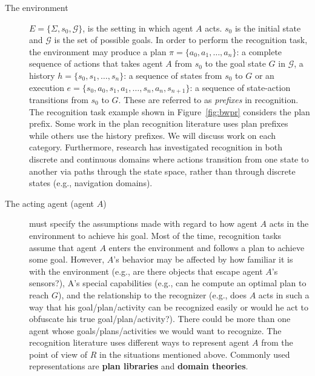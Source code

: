 \begin{description}
\item [The environment] $E = \lbrace \Sigma, s_0, \mathcal{G}\rbrace$, is the setting in which agent $A$ acts. $s_0$ is the initial state and $\mathcal{G}$ is the set of possible goals. 
In order to perform the recognition task, the environment may produce a plan $\pi=\lbrace a_0, a_1, \ldots, a_n\rbrace$: a complete sequence of actions that takes agent $A$ from $s_0$ to the goal state $G$ in $\mathcal{G}$, a history $h=\lbrace s_0, s_1, \ldots, s_n\rbrace$: a sequence of states from $s_0$ to $G$ or an execution $e=\lbrace s_0, a_0, s_1, a_1, \ldots, s_n, a_n, s_{n+1}\rbrace$: a sequence of state-action transitions from $s_0$ to $G$. 
These are referred to as \textit{prefixes} in recognition. 
The recognition task example shown in Figure~\ref{fig:bwpr} considers the plan prefix. Some work in the plan recognition literature uses plan prefixes while others use the history prefixes. We will discuss work on each category. Furthermore, research has investigated recognition in both discrete and continuous domains where actions transition from one state to another via paths through the state space, rather than through discrete states (e.g., navigation domains).

\item [The acting agent (agent $A$)] must specify the assumptions made with regard to how agent $A$ acts in the environment to achieve his goal. Most of the time, recognition tasks assume that agent $A$ enters the environment and follows a plan to achieve some goal. However, $A$'s behavior may be affected by how familiar it is with the environment (e.g., are there objects that escape agent $A$'s sensors?), A's special capabilities (e.g., can he compute an optimal plan to reach $G$), and the relationship to the recognizer (e.g., does $A$ acts in such a way that his goal/plan/activity can be recognized easily or would he act to obfuscate his true goal/plan/activity?). There could be more than one agent whose goals/plans/activities we would want to recognize.
The recognition literature uses different ways to represent agent $A$ from the point of view of $R$ in the situations mentioned above. Commonly used representations are \textbf{plan libraries} and \textbf{domain theories}.


\end{description}
